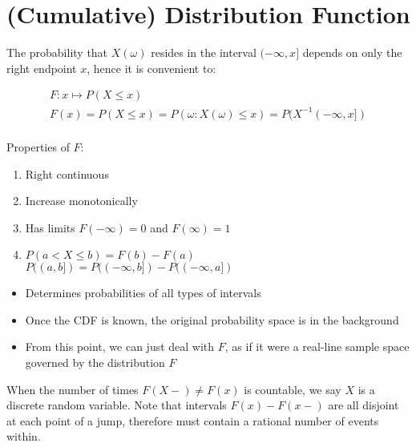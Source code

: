 \documentclass[11pt,a4paper,margin=1in]{article}
\begin{document}
\section{(Cumulative) Distribution Function}
\begin{flushleft}
    The probability that $X(\omega)$ resides in the interval $(-\infty, x]$ depends 
    on only the right endpoint $x$, hence it is convenient to:
\end{flushleft}
\begin{gather*}
    F : x \mapsto P(X \leq x) \\
    F(x) = P(X \leq x) = P({\omega : X(\omega) \leq x}) = P(X^{-1}(-\infty, x])\\
\end{gather*}
\begin{flushleft}
    Properties of $F$:
\end{flushleft}
\begin{enumerate}[1.]
    \item Right continuous
    \item Increase monotonically
    \item Has limits $F(-\infty) = 0$ and $F(\infty) = 1$
    \item 
        $P(a < X \leq b) = F(b) - F(a)$ \\
        $P((a, b]) = P((-\infty, b]) - P((-\infty, a])$ \\
\end{enumerate}
\begin{itemize}
    \item Determines probabilities of all types of intervals
    \item Once the CDF is known, the original probability space is in the background
    \item From this point, we can just deal with $F$, as if it were a real-line
    sample space governed by the distribution $F$
\end{itemize}
\begin{flushleft}
    When the number of times $F(X-) \neq F(x)$ is countable, we say $X$ is a 
    discrete random variable. Note that intervals $F(x) - F(x-)$ are all disjoint
    at each point of a jump, therefore must contain a rational number of events
    within.
\end{flushleft}
\end{document}
